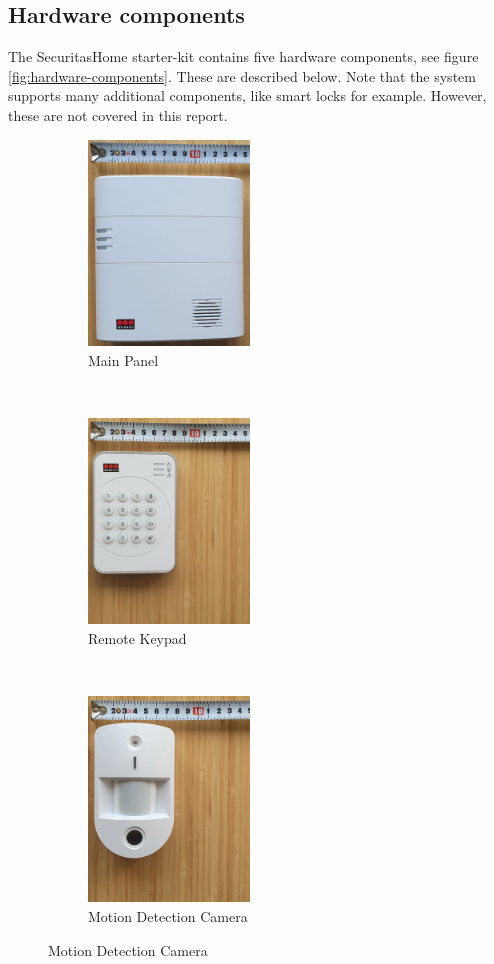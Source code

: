 \subsection{Hardware components} \label{ch:system:hardware}
The SecuritasHome starter-kit contains five hardware components, see figure \ref{fig:hardware-components}. These are described below. Note that the system supports many additional components, like smart locks for example. However, these are not covered in this report.
\begin{figure}[!ht]
    \centering
    \begin{subfigure}[t]{0.33\textwidth}
        \centering
        \includegraphics[height=2.15in]{images/main-panel.png}
        \caption{Main Panel}
        \label{fig:main-panel}
    \end{subfigure}%
    ~
    \begin{subfigure}[t]{0.33\textwidth}
        \centering
        \includegraphics[height=2.15in]{images/keypad.png}
        \caption{Remote Keypad}
        \label{fig:remote-keypad}
    \end{subfigure}%
    ~
    \begin{subfigure}[t]{0.33\textwidth}
        \centering
        \includegraphics[height=2.15in]{images/camera.png}
        \caption{Motion Detection Camera}
        \label{fig:motion-camera}
    \end{subfigure}
    

\end{figure}
